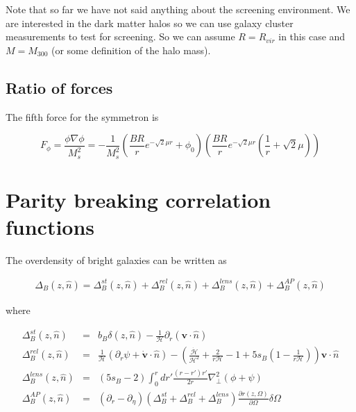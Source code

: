 \documentclass[aps,showpacs,onecolumn,floats,prd,superscriptaddress,nofootinbib]{revtex4-1}
\begin{document}
Note that so far we have not said anything about the screening environment. 
We are interested in the dark matter halos so we can use galaxy cluster measurements to test for screening. So we can assume $R = R_{vir}$ in this case and $M = M_{300}$ (or some definition of the halo mass). 

\subsection{Ratio of forces}

The fifth force for the symmetron is

\begin{equation}
	F_\phi = \frac{\phi\nabla \phi}{M_s^2} = - \frac{1}{M_s^2} \left(\frac{BR}{r} e^{-\sqrt{2} \mu r} + \phi_0 \right) \left( \frac{BR}{r} e^{-\sqrt{2}\mu r} \left( \frac{1}{r} + \sqrt{2} \mu \right) \right)
\end{equation}

\section{Parity breaking correlation functions}

The overdensity of bright galaxies can be written as

\begin{eqnarray}
	\Delta_{B}(z,\hat{n}) = \Delta_B^{st}(z,\hat{n}) + \Delta_B^{rel} (z,\hat{n})+\Delta_B^{lens} (z,\hat{n}) + \Delta_B^{AP} (z,\hat{n}) 
\end{eqnarray}

where 

\begin{eqnarray}
	\Delta^{st}_B(z,\hat{n}) & = & b_B \delta(z,\hat{n}) - \frac{1}{\mathcal{H}} \partial_r(\textbf{v}\cdot \hat{n}) 	\\
	\Delta^{rel}_B(z,\hat{n}) & = & \frac{1}{\mathcal{H}} \left( \partial_r \psi + \dot{\textbf{v}}\cdot \hat{n} \right) - \left( \frac{\dot{\mathcal{H}}}{\mathcal{H}^2} + \frac{2}{r\mathcal{H}} - 1 + 5s_B \left( 1 - \frac{1}{r \mathcal{H}} \right) \right) \textbf{v} \cdot \hat{n} \label{rel_screen} \\
	\Delta^{lens}_B(z,\hat{n}) & = & (5s_B -2) \int^r_0 dr' \frac{(r-r')r'}{2r} \nabla^2_\bot (\phi + \psi) \\
	\Delta^{AP}_{B}(z,\hat{n}) & = & (\partial_r - \partial_\eta) (\Delta^{st}_B + \Delta^{rel}_B + \Delta^{lens}_B )\frac{\partial r(z,\Omega)}{\partial \Omega} \delta \Omega
\end{eqnarray}
\end{document}

